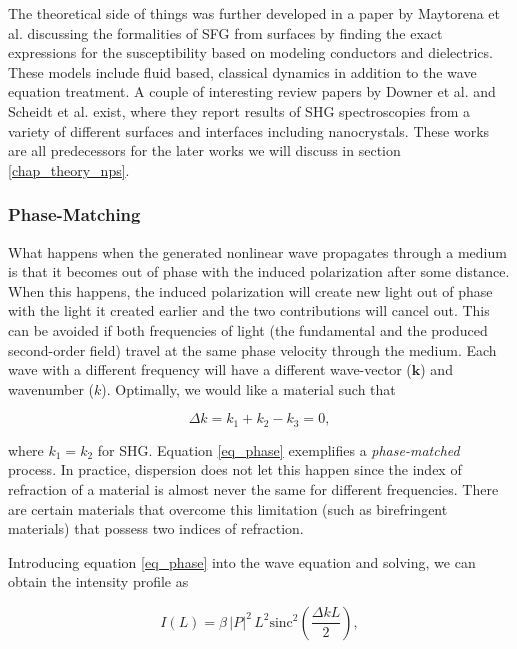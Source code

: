 \documentclass[10pt]{article}
\begin{document}
The theoretical side of things was further developed in a paper by Maytorena et al. \cite{PhysRevB.57.2569} discussing the formalities of SFG from surfaces by finding the exact expressions for the susceptibility based on modeling conductors and dielectrics. These models include fluid based, classical dynamics in addition to the wave equation treatment. A couple of interesting review papers by Downer et al. \cite{downer2001optical} and Scheidt et al. \cite{scheidt2004optical} exist, where they report results of SHG spectroscopies from a variety of different surfaces and interfaces including nanocrystals. These works are all predecessors for the later works we will discuss in section \ref{chap_theory_nps}.

\subsubsection{Phase-Matching}
What happens when the generated nonlinear wave propagates through a medium is that it becomes out of phase with the induced polarization after some distance. When this happens, the induced polarization will create new light out of phase with the light it created earlier and the two contributions will cancel out. This can be avoided if both frequencies of light (the fundamental and the produced second-order field) travel at the same phase velocity through the medium. Each wave with a different frequency will have a different wave-vector ($\mathbf{k}$) and wavenumber ($k$). Optimally, we would like a material such that

\begin{equation}
\Delta k = k_{1} + k_{2} - k_{3} = 0,\label{eq_phase}
\end{equation}

where $k_{1} = k_{2}$ for SHG. Equation \eqref{eq_phase} exemplifies a \emph{phase-matched} process. In practice, dispersion does not let this happen since the index of refraction of a material is almost never the same for different frequencies. There are certain materials that overcome this limitation (such as birefringent materials) that possess two indices of refraction.

Introducing equation \eqref{eq_phase} into the wave equation and solving, we can obtain the intensity profile \cite{boyd2003nonlinear} as

\begin{equation}
I(L) = \beta\,\vert P\vert^{2}\,L^{2}\text{sinc}^{2}\left(\frac{\Delta k L}{2}\right),
\end{equation}
\end{document}
